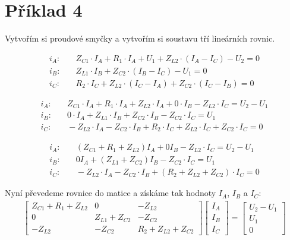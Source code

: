 \section{Příklad 4}

\nopagebreak
Vytvořím si proudové smyčky a vytvořím si soustavu tří lineárních rovnic.

\begin{align*}
i_A: & \quad
Z_{C1} \cdot I_A + R_1 \cdot I_A + U_1 + Z_{L2} \cdot (I_A - I_C) - U_2 = 0 \\
i_B: & \quad
Z_{L1} \cdot I_B + Z_{C2} \cdot (I_B - I_C) - U_1 = 0 \\
i_C: & \quad
R_2 \cdot I_C + Z_{L2} \cdot (I_C - I_A) + Z_{C2} \cdot (I_C - I_B) = 0
\end{align*}

\begin{align*}
i_A: & \quad
Z_{C1} \cdot I_A + R_1 \cdot I_A + Z_{L2} \cdot I_A + 0 \cdot I_B - Z_{L2} \cdot I_C = U_2 - U_1 \\
i_B: & \quad
0 \cdot I_A + Z_{L1} \cdot I_B + Z_{C2} \cdot I_B - Z_{C2} \cdot I_C = U_1 \\
i_C: & \quad
-Z_{L2} \cdot I_A - Z_{C2} \cdot I_B + R_2 \cdot I_C + Z_{L2} \cdot I_C + Z_{C2} \cdot I_C = 0
\end{align*}

\begin{align*}
i_A: & \quad
(Z_{C1} + R_1 + Z_{L2})I_A + 0I_B - Z_{L2} \cdot I_C = U_2 - U_1 \\
i_B: & \quad
0I_A + (Z_{L1} + Z_{C2})I_B - Z_{C2} \cdot I_C = U_1 \\
i_C: & \quad
-Z_{L2} \cdot I_A - Z_{C2} \cdot I_B + (R_2 + Z_{L2} + Z_{C2}) \cdot I_C = 0
\end{align*}
\par
Nyní převedeme rovnice do matice a získáme tak hodnoty \( I_A \), \( I_B \) a \( I_C \):
\nopagebreak
\begin{align*}
\begin{bmatrix}
Z_{C1} + R_1 + Z_{L2} & 0 & -Z_{L2} \\
0 & Z_{L1} + Z_{C2} & -Z_{C2} \\
-Z_{L2} & -Z_{C2} & R_2 + Z_{L2} + Z_{C2}
\end{bmatrix}
\begin{bmatrix}
I_A \\
I_B \\
I_C
\end{bmatrix}
=
\begin{bmatrix}
U_2 - U_1 \\
U_1 \\
0
\end{bmatrix}
\end{align*}
\newpage

